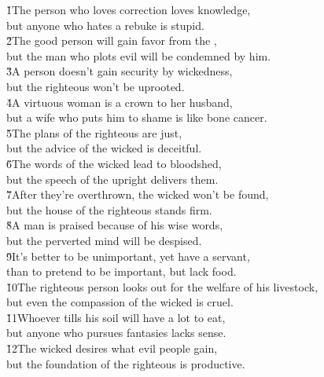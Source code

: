 \begin{poetry}
\poeml {}
\v{1}The person who loves correction loves knowledge, \\
\poeml but anyone who hates a rebuke is stupid. \\
\poeml \v{2}The good person will gain favor from the , \\
\poemll    but the man who plots evil will be condemned by him. \\
\poeml \v{3}A person doesn't gain security by wickedness, \\
\poemll    but the righteous won't be uprooted. \\
\poeml \v{4}A virtuous woman is a crown to her husband, \\
\poemll    but a wife who puts him to shame is like bone cancer. \\
\poeml \v{5}The plans of the righteous are just, \\
\poemll    but the advice of the wicked is deceitful. \\
\poeml \v{6}The words of the wicked lead to bloodshed, \\
\poemll    but the speech of the upright delivers them. \\
\poeml \v{7}After they're overthrown, the wicked won't be found, \\
\poemll    but the house of the righteous stands firm. \\
\poeml \v{8}A man is praised because of his wise words, \\
\poemll    but the perverted mind will be despised. \\
\poeml \v{9}It's better to be unimportant, yet have a servant, \\
\poemll    than to pretend to be important, but lack food. \\
\poeml \v{10}The righteous person looks out for the welfare of his livestock, \\
\poemll    but even the compassion of the wicked is cruel. \\
\poeml \v{11}Whoever tills his soil will have a lot to eat, \\
\poemll    but anyone who pursues fantasies lacks sense. \\
\poeml \v{12}The wicked desires what evil people gain, \\
\poemll    but the foundation of the righteous is productive. \\

\end{poetry}
